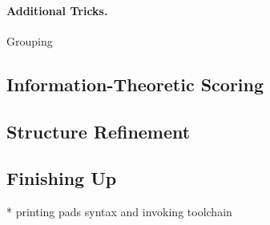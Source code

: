 \begin {figure*}
\begin{minipage}[t]{0.5\columnwidth}
\end{minipage}
\begin{minipage}[t]{0.5\columnwidth}
\end{minipage}
\begin{minipage}[t]{0.5\columnwidth}
\end{minipage}
\begin{minipage}[t]{0.5\columnwidth}
\end{minipage}
%
%
%
\caption{Selected Histograms for Crashreporter.log and Dibbler.1000}
\label{fig:histograms} 
\end{figure*}

\paragraph*{Additional Tricks.}
Grouping




\subsection {Information-Theoretic Scoring}



\subsection {Structure Refinement}

%


 

\subsection {Finishing Up}

    * printing pads syntax and invoking toolchain
